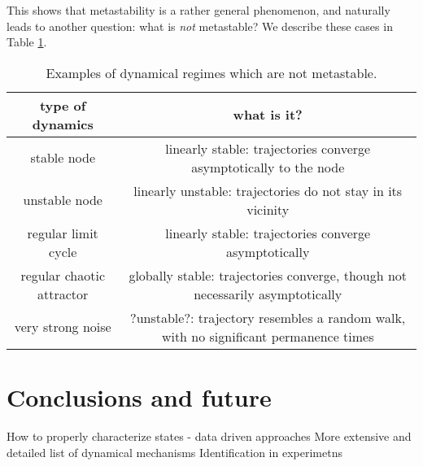 \documentclass[preprint,superscriptaddress,showpacs,amsmath,amssymb,aps,pre,floatfix]{revtex4-1}
\theoremstyle{definition}
\begin{document}
This shows that metastability is a rather general phenomenon, and naturally leads to another question: what is \textit{not} metastable? We describe these cases in Table \ref{tab:notmetastable}.
% 
\begin{table}[htb]
    \centering
    \begin{tabular}{|c|c|}
    \hline
        type of dynamics & what is it? \\
        \hline
         stable node & linearly stable: trajectories converge asymptotically to the node \\
         unstable node & linearly unstable: trajectories do not stay in its vicinity \\
         regular limit cycle & linearly stable: trajectories converge asymptotically \\ 
         regular chaotic attractor & globally stable: trajectories converge, though not necessarily asymptotically \\ 
         very strong noise & ?unstable?: trajectory resembles a random walk, with no significant permanence times \\
    \hline
    \end{tabular}
    \caption{Examples of dynamical regimes which are not metastable.}
    \label{tab:notmetastable}
\end{table}

\section{Conclusions and future}
How to properly characterize states - data driven approaches 
More extensive and detailed list of dynamical mechanisms
Identification in experimetns
\end{document}
